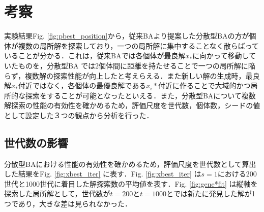 \documentclass{jarticle}
\begin{document}
\section{考察}
実験結果Fig. \ref{fig:pbest_position}から，従来BAより提案した分散型BAの方が個体が複数の局所解を探索しており，一つの局所解に集中することなく散らばっていることが分かる．これは，従来BAでは各個体が最良解${x_*}$に向かって移動していたものを，分散型BA では2個体間に距離を持たせることで一つの局所解に陥らず，複数解の探索性能が向上したと考えらえる．また新しい解の生成時，最良解${x_*}$付近ではなく，各個体の最優良解である${x_i*}$付近に作ることで大域的かつ局所的な探索をすることが可能となったといえる．また，分散型BAについて複数解探索の性能の有効性を確かめるため，評価尺度を世代数，個体数，シードの値として設定した３つの観点から分析を行った．

\subsection{世代数の影響}
分散型BAにおける性能の有効性を確かめるため，評価尺度を世代数として算出した結果をFig. \ref{fig:xbest_iter} に表す．Fig. \ref{fig:xbest_iter} は${s=1}$における200世代と1000世代に着目した解探索数の平均値を表す．Fig. \ref{fig:gene*fit} は縦軸を探索した局所解として，世代数が${t=200}$と${t=1000}$とでは新たに発見した解が1つであり，大きな差は見られなかった．
\end{document}
